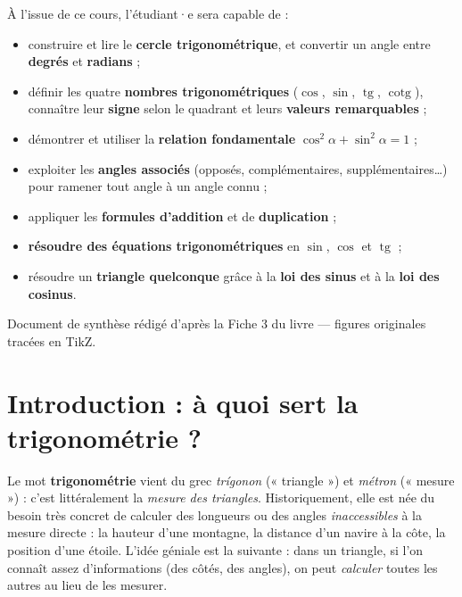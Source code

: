 \documentclass[11pt,a4paper]{article}
\DeclareMathOperator{\tg}{tg}        %
\DeclareMathOperator{\cotg}{cotg}    %
\begin{document}
\begin{tcolorbox}[boxbase,colback=primary!5,colframe=primary,width=15cm,
    title={\textsc{Objectifs pédagogiques de la fiche}}]
À l'issue de ce cours, l'étudiant·e sera capable de :
\begin{itemize}[leftmargin=1.6em,topsep=2pt,itemsep=1pt]
  \item construire et lire le \textbf{cercle trigonométrique}, et convertir un angle entre \textbf{degrés} et \textbf{radians} ;
  \item définir les quatre \textbf{nombres trigonométriques} ($\cos$, $\sin$, $\tg$, $\cotg$), connaître leur \textbf{signe} selon le quadrant et leurs \textbf{valeurs remarquables} ;
  \item démontrer et utiliser la \textbf{relation fondamentale} $\cos^2\alpha+\sin^2\alpha=1$ ;
  \item exploiter les \textbf{angles associés} (opposés, complémentaires, supplémentaires\dots) pour ramener tout angle à un angle connu ;
  \item appliquer les \textbf{formules d'addition} et de \textbf{duplication} ;
  \item \textbf{résoudre des équations trigonométriques} en $\sin$, $\cos$ et $\tg$ ;
  \item résoudre un \textbf{triangle quelconque} grâce à la \textbf{loi des sinus} et à la \textbf{loi des cosinus}.
\end{itemize}
\end{tcolorbox}

\vspace{0.5cm}
{\small\color{black!60} Document de synthèse rédigé d'après la Fiche 3 du livre — figures originales tracées en TikZ.}
\par
\endgroup

\newpage
\renewcommand{\contentsname}{\textcolor{primarydark}{Table des matières}}
\tableofcontents
\thispagestyle{fancy}
\newpage

\section{Introduction : à quoi sert la trigonométrie ?}
Le mot \textbf{trigonométrie} vient du grec \emph{trígonon} (« triangle ») et \emph{métron} (« mesure ») :
c'est littéralement la \emph{mesure des triangles}. Historiquement, elle est née du besoin très concret
de calculer des longueurs ou des angles \emph{inaccessibles} à la mesure directe : la hauteur d'une
montagne, la distance d'un navire à la côte, la position d'une étoile. L'idée géniale est la suivante :
dans un triangle, si l'on connaît assez d'informations (des côtés, des angles), on peut \emph{calculer}
toutes les autres au lieu de les mesurer.
\end{document}
